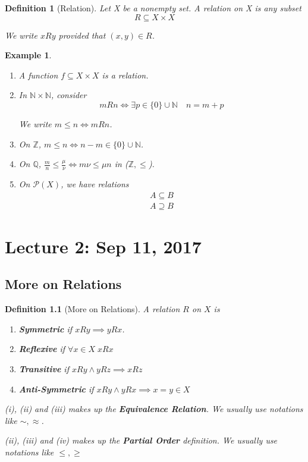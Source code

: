 \documentclass[11pt, oneside]{book}
\theoremstyle{break}
\newtheorem{defn}{Definition}[section]
\newtheorem{eg}{Example}[section]
\newcommand{\bb}[1]{\mathbb{#1}}			%
\begin{document}
\begin{defn}[Relation]
	Let X be a nonempty set. A relation on X is any subset
	\begin{equation}
		R \subseteq X \times X
	\end{equation}

	We write $xRy$ provided that $(x, y) \in R$.
\end{defn}

\begin{eg}
	\label{eg:relation}
	\begin{enumerate}
		\item A function $f \subseteq X \times X$ is a relation.
		\item In $\bb{N} \times \bb{N}$, consider
			\begin{equation}
				mRn \iff \exists p \in \{0\} \cup \bb{N} \quad n = m + p
			\end{equation}

			We write $m \leq n \iff mRn$.

		\item On $\bb{Z}$, $m \leq n \iff n - m \in \{0\} \cup \bb{N}$.

		\item On $\bb{Q}$, $\frac{m}{n} \leq \frac{\mu}{\nu} \iff m \nu \leq \mu n$ in ($\bb{Z}, \leq$).

		\item On $\mathcal{P}(X)$, we have relations
			\begin{gather*}
				A \subseteq B \\
				A \supseteq B
			\end{gather*}
	\end{enumerate}
\end{eg}

\chapter{Lecture 2: Sep 11, 2017}\label{chp:lec2}

\section{More on Relations}

\begin{defn}[More on Relations]
	A relation $R$ on $X$ is
	\begin{enumerate}
		\item \textbf{Symmetric} if $xRy \implies yRx$.
		\item \textbf{Reflexive} if $\forall x \in X \; xRx$
		\item \textbf{Transitive} if $xRy \land yRz \implies xRz$
		\item \textbf{Anti-Symmetric} if $xRy \land yRx \implies x = y \in X$
	\end{enumerate}

	(i), (ii) and (iii) makes up the \textbf{Equivalence Relation}. We usually use notations like $\sim, \approx$.

	(ii), (iii) and (iv) makes up the \textbf{Partial Order} definition. We usually use notations like $\leq, \geq$
\end{defn}
\end{document}
